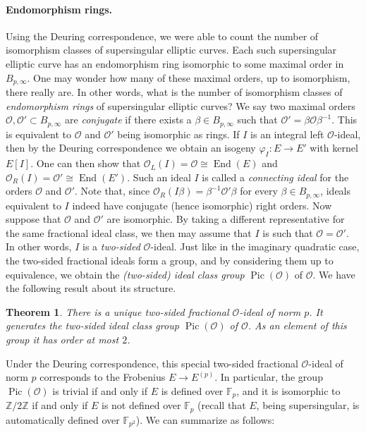\documentclass[10pt]{article}
\theoremstyle{plain}
\newtheorem{theorem}{Theorem}
\theoremstyle{definition}
\DeclareMathOperator{\End}{End} %
\DeclareMathOperator{\Pic}{Pic} %
\def\F{\ensuremath{\mathbb{F}}}
\def\Z{\ensuremath{\mathbb{Z}}}
\def\O{\ensuremath{\mathcal{O}}}
\begin{document}
\paragraph{Endomorphism rings.}
Using the Deuring correspondence, we were able to count the
number of isomorphism classes of supersingular elliptic curves.
Each such supersingular elliptic curve has an endomorphism ring
isomorphic to some maximal order in $B_{p,\infty}$.
One may wonder how many of these maximal orders, up to isomorphism,
there really are. In other words,
what is the number of isomorphism classes of \emph{endomorphism rings}
of supersingular elliptic curves?
We say two maximal orders $\O,\O'\subset B_{p,\infty}$
are \emph{conjugate} if there exists a $\beta\in B_{p,\infty}$ such
that $\O' = \beta\O\beta^{-1}$. This is equivalent to $\O$ and $\O'$
being isomorphic as rings.
If $I$ is an integral left $\O$-ideal, then by the Deuring
correspondence we obtain an isogeny $\varphi_I : E\to E'$
with kernel $E[I]$.
One can then show that $\O_L(I)=\O\cong\End(E)$
and $\O_R(I)=\O'\cong\End(E')$.
Such an ideal $I$ is called a \emph{connecting ideal}
for the orders $\O$ and $\O'$. 
Note that, since $\O_R(I\beta)=\beta^{-1}\O'\beta$ for every
$\beta\in B_{p,\infty}$, ideals equivalent to $I$ indeed
have conjugate (hence isomorphic) right orders.
Now suppose that $\O$ and $\O'$ are isomorphic. By taking a different
representative for the same fractional ideal class,
we then may assume that $I$ is such that $\O=\O'$.
In other words, $I$ is a \emph{two-sided}
$\O$-ideal. Just like in the imaginary quadratic case, the
two-sided fractional ideals form a group, and by considering them up to
equivalence, we obtain the \emph{(two-sided) ideal class group}
$\Pic(\O)$ of $\O$.
We have the following result about its structure.
\begin{theorem}
There is a unique two-sided fractional $\O$-ideal of norm $p$.
It generates the two-sided ideal class group $\Pic(\O)$ of $\O$.
As an element of this group it has order at most $2$.
\end{theorem}
Under the Deuring correspondence, this special two-sided fractional
$\O$-ideal of norm $p$
corresponds to the Frobenius $E\to E^{(p)}$.
In particular, the group $\Pic(\O)$ is trivial if and only if $E$ is
defined over $\F_p$, and it is isomorphic to $\Z/2\Z$ if and only if
$E$ is not defined over $\F_p$ (recall that $E$, being supersingular,
is automatically defined over $\F_{p^2}$).
We can summarize as follows:
\end{document}
